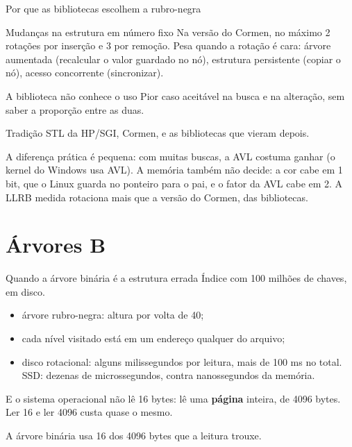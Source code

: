 \documentclass{beamer}
\begin{document}
\begin{frame}{Por que as bibliotecas escolhem a rubro-negra}
	\begin{block}{Mudanças na estrutura em número fixo}
		Na versão do Cormen, no máximo 2 rotações por inserção e 3 por remoção. Pesa quando a rotação é
		cara: árvore aumentada (recalcular o valor guardado no nó), estrutura
		persistente (copiar o nó), acesso concorrente (sincronizar).
	\end{block}

	\begin{block}{A biblioteca não conhece o uso}
		Pior caso aceitável na busca e na alteração, sem saber a proporção entre
		as duas.
	\end{block}

	\begin{block}{Tradição}
		STL da HP/SGI, Cormen, e as bibliotecas que vieram depois.
	\end{block}

	\vspace{0.1cm}
	\footnotesize A diferença prática é pequena: com muitas buscas, a AVL costuma
	ganhar (o kernel do Windows usa AVL). A memória também não decide: a cor cabe
	em 1 bit, que o Linux guarda no ponteiro para o pai, e o fator da AVL cabe em
	2. A LLRB medida rotaciona mais que a versão do Cormen, das bibliotecas.
\end{frame}

\section{Árvores B}

\begin{frame}{Quando a árvore binária é a estrutura errada}
	Índice com 100 milhões de chaves, em disco.

	\vspace{0.4cm}
	\begin{itemize}
		\item árvore rubro-negra: altura por volta de 40;
		\item cada nível visitado está em um endereço qualquer do arquivo;
		\item disco rotacional: alguns milissegundos por leitura, mais de 100 ms no
		      total. SSD: dezenas de microssegundos, contra nanossegundos da
		      memória.
	\end{itemize}

	\vspace{0.4cm}
	E o sistema operacional não lê 16 bytes: lê uma \textbf{página} inteira, de
	4096 bytes. Ler 16 e ler 4096 custa quase o mesmo.

	\vspace{0.3cm}
	A árvore binária usa 16 dos 4096 bytes que a leitura trouxe.
\end{frame}
\end{document}
